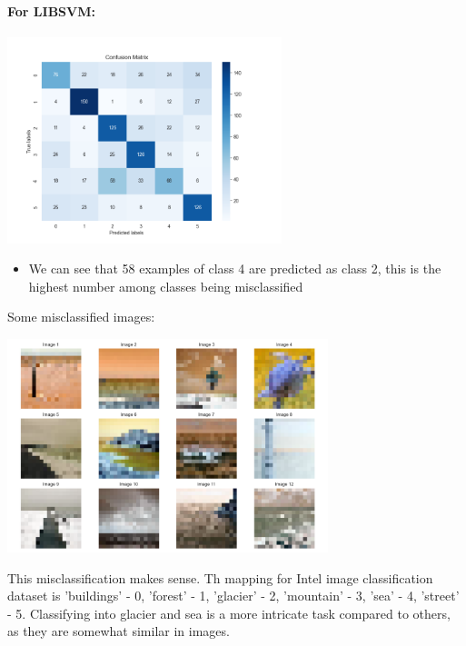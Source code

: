 \documentclass[12pt,a4paper]{article}
\begin{document}
\paragraph{For LIBSVM:}

\includegraphics[width=0.6\textwidth]{Assignment 2/q2/confusion_matrix libsvm.png}
\begin{itemize}
    \item We can see that 58 examples of class 4 are predicted as class 2, this is the highest number among classes being misclassified
\end{itemize}
Some misclassified images:


\includegraphics[width=0.7\textwidth]{Assignment 2/q2/misclassified_4_2.png}


This misclassification makes sense. Th mapping for Intel image classification dataset is 'buildings' - 0,
'forest' - 1,
'glacier' - 2,
'mountain' - 3,
'sea' - 4,
'street' - 5. Classifying into glacier and sea is a more intricate task compared to others, as they are somewhat similar in images.
\end{document}
